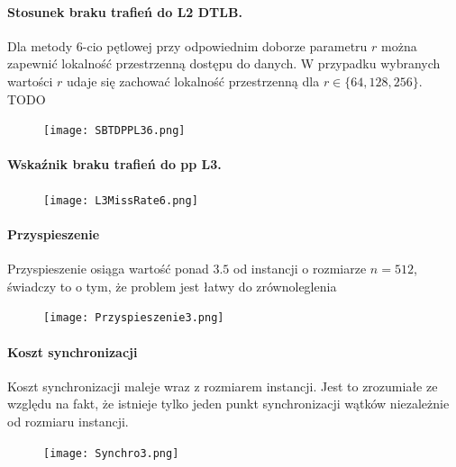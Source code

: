 \documentclass{scrartcl}
\begin{document}
\paragraph{Stosunek braku trafień do L2 DTLB.} Dla metody 6-cio pętlowej przy odpowiednim doborze parametru $r$ można zapewnić lokalność przestrzenną dostępu do danych. W przypadku wybranych wartości $r$ udaje się zachować lokalność przestrzenną dla $r \in \{64, 128, 256\}$. TODO
\begin{figure}[H]
\texttt{[image: SBTDPPL36.png]}\\
\end{figure}

\paragraph{Wskaźnik braku trafień do pp L3.} 
\begin{figure}[H]
\texttt{[image: L3MissRate6.png]}
\end{figure}

\paragraph{Przyspieszenie} Przyspieszenie osiąga wartość ponad $3.5$ od instancji o rozmiarze $n = 512$, świadczy to o tym, że problem jest łatwy do zrównoleglenia
\begin{figure}[H]
\texttt{[image: Przyspieszenie3.png]}
\end{figure}

\paragraph{Koszt synchronizacji} Koszt synchronizacji maleje wraz z rozmiarem instancji. Jest to zrozumiałe ze względu na fakt, że istnieje tylko jeden punkt synchronizacji wątków niezależnie od rozmiaru instancji.
\begin{figure}[H]
\texttt{[image: Synchro3.png]}
\end{figure}
\end{document}
